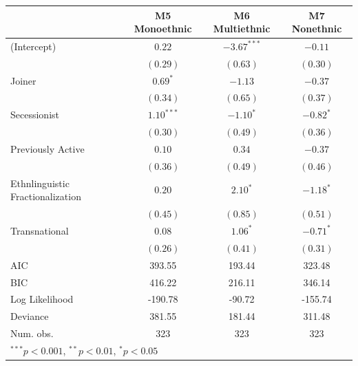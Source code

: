 \documentclass[12pt,]{book}
\let\origtable\table
\let\endorigtable\endtable
\renewenvironment{table}[1][2] {
    \singlespacing
    \expandafter\origtable\expandafter[H]
} {
    \endorigtable
}
\theoremstyle{definition}
\theoremstyle{definition}
\theoremstyle{remark}
\begin{document}
\begin{table}
\begin{center}
\begin{tabular}{l c c c }
\hline
 & M5 Monoethnic & M6 Multiethnic & M7 Nonethnic \\
\hline
(Intercept)                      & $0.22$       & $-3.67^{***}$ & $-0.11$     \\
                                 & $(0.29)$     & $(0.63)$      & $(0.30)$    \\
Joiner                           & $0.69^{*}$   & $-1.13$       & $-0.37$     \\
                                 & $(0.34)$     & $(0.65)$      & $(0.37)$    \\
Secessionist                     & $1.10^{***}$ & $-1.10^{*}$   & $-0.82^{*}$ \\
                                 & $(0.30)$     & $(0.49)$      & $(0.36)$    \\
Previously Active                & $0.10$       & $0.34$        & $-0.37$     \\
                                 & $(0.36)$     & $(0.49)$      & $(0.46)$    \\
Ethnlinguistic Fractionalization & $0.20$       & $2.10^{*}$    & $-1.18^{*}$ \\
                                 & $(0.45)$     & $(0.85)$      & $(0.51)$    \\
Transnational                    & $0.08$       & $1.06^{*}$    & $-0.71^{*}$ \\
                                 & $(0.26)$     & $(0.41)$      & $(0.31)$    \\
\hline
AIC                              & 393.55       & 193.44        & 323.48      \\
BIC                              & 416.22       & 216.11        & 346.14      \\
Log Likelihood                   & -190.78      & -90.72        & -155.74     \\
Deviance                         & 381.55       & 181.44        & 311.48      \\
Num. obs.                        & 323          & 323           & 323         \\
\hline
\multicolumn{4}{l}{\scriptsize{$^{***}p<0.001$, $^{**}p<0.01$, $^*p<0.05$}}
\end{tabular}
\caption{Logit Models of Rebel Group Ethnic Composition}
\label{tab:comp}
\end{center}
\end{table}
\end{document}
